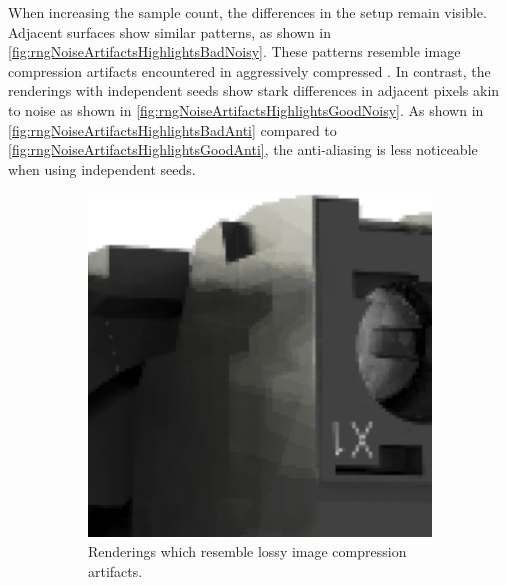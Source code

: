 When increasing the sample count, the differences in the setup remain visible. Adjacent surfaces show similar patterns, as shown in \autoref{fig:rngNoiseArtifactsHighlightsBadNoisy}. These patterns resemble image compression artifacts encountered in aggressively compressed . In contrast, the renderings with independent seeds show stark differences in adjacent pixels akin to noise as shown in \autoref{fig:rngNoiseArtifactsHighlightsGoodNoisy}. As shown in \autoref{fig:rngNoiseArtifactsHighlightsBadAnti} compared to \autoref{fig:rngNoiseArtifactsHighlightsGoodAnti}, the anti-aliasing is less noticeable when using independent seeds.

\begin{figure}[H]
    \centering
    \hspace*{2cm}
    \begin{subfigure}[t]{0.3\textwidth}
        \includegraphics[width=\textwidth]{resources/bad-seed-noisy.png}
        \caption{Renderings which resemble lossy image compression artifacts.}
        \label{fig:rngNoiseArtifactsHighlightsBadNoisy}
    \end{subfigure}
    \hfill
    \begin{subfigure}[t]{0.3\textwidth}

\end{subfigure}
\end{figure}
